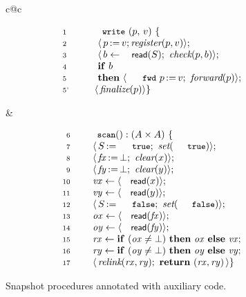 \begin{figure}[t]
%
\centering
\begin{tabular}{c@{\hfill}c}
%
\begin{minipage}[t]{.5\textwidth}
\[
\begin{array}{ll}
\num{1}~ & ~~ \esc{write}\ (p,\, v)\ \{\\ 
\num{2}~ & ~~~~~ \lat\,\actwrite{p}{v}; \aux{register}(p,v)\rat;\\
\num{3}~ & ~~~~~ \lat\, b \tbnd \act{read}(S);\ \aux{check}(p,b) \rat;\\
\num{4}~ & ~~~~~ \kw{if}\ b\\
\num{5}~ & ~~~~~ \kw{then}\ \lat\,%
                           \actwrite{\aleksfwdp{p}}{v};\ \aux{forward}(p)\rat; \\
\num{5'}~           & ~~~~ \lat\,\aux{finalize}(p)\rat\}
\end{array}
\]
\end{minipage}
%
&
%
\begin{minipage}[t]{.5\textwidth}
\[
\begin{array}{rl}
\num{6}~  & \esc{scan} () : ( A \times A )~ \{ \\ 
\num{7}~  & ~~~ \lat\,\actwrite{\s}{\esc{true}};\ \aux{set}(\esc{true}) \rat;\\  
\num{8}~  & ~~~ \lat\,\actwrite{\fx}{\bot};\ \aux{clear}(\x)\rat;\\
\num{9}~  & ~~~ \lat\,\actwrite{\fy}{\bot};\ \aux{clear}(\y)\rat;\\
\num{10}~ & ~~~ \var{vx} \tbnd \lat \act{read}(\x) \rat ; \\
\num{11}~ & ~~~ \var{vy} \tbnd \lat \act{read}(\y) \rat;  \\
\num{12}~ & ~~~ \lat\,\actwrite{\s}{\esc{false}};\ \aux{set}(\esc{false})\rat;\\
\num{13}~ & ~~~ \var{ox} \tbnd \lat \act{read}(\fx) \rat;\\
\num{14}~ & ~~~ \var{oy} \tbnd \lat \act{read}(\fy) \rat;\\
\num{15}~ & ~~~ \var{rx} \tbnd \kw{if}\ (\var{ox} \neq\bot)\
                \kw{then}\ \var{ox}\ \kw{else}\ \var{vx};\\
\num{16}~ & ~~~ \var{ry} \tbnd \kw{if}\ (\var{oy} \neq\bot)\
                \kw{then}\ \var{oy}\ \kw{else}\ \var{vy};\\
\num{17}~ & ~~~ \lat\,\aux{relink}(\var{rx}, \var{ry});\
                \kw{return}\ (\var{rx}, \var{ry})\,\rat\}
\end{array}
\]
\end{minipage}
%
\end{tabular}
%
\caption{Snapshot procedures annotated with auxiliary code.}
\label{fig:fcsl-snapshot}
\end{figure}



